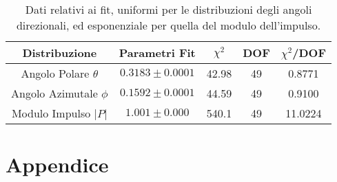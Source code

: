 \documentclass{article}
\begin{document}
\begin{table}
    \centering
    \begin{tabular}{||c|c|c|c|c||}
        \hline
        Distribuzione & Parametri Fit & $\chi^2$ & DOF & $\chi^2$/DOF \\
        \hline \hline
        Angolo Polare $\theta$ & $0.3183 \pm 0.0001$ & 42.98 & 49 & 0.8771 \\
        \hline
        Angolo Azimutale $\phi$ & $0.1592 \pm 0.0001$ & 44.59 & 49 & 0.9100 \\
        \hline
        Modulo Impulso $|P|$ & $1.001 \pm 0.000$ & 540.1 & 49 & 11.0224 \\
        \hline
    \end{tabular}
    \caption{Dati relativi ai fit, uniformi per le distribuzioni degli angoli direzionali, ed esponenziale per quella del modulo dell'impulso.}
    \label{table:impulso}
\end{table}



\pagebreak

\section*{Appendice}
\end{document}
